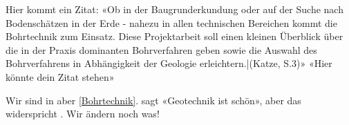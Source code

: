 Hier kommt ein Zitat: «Ob in der Baugrunderkundung oder auf der Suche nach Bodenschätzen in der Erde - nahezu in allen technischen Bereichen kommt die Bohrtechnik zum Einsatz. Diese Projektarbeit soll einen kleinen Überblick über die in der Praxis dominanten Bohrverfahren geben sowie die Auswahl des Bohrverfahrens in Abhängigkeit der Geologie erleichtern.|(Katze, S.3)» «Hier könnte dein Zitat stehen» 

Wir sind in  aber \cref{Bohrtechnik}. \textcite{ziegler2012geotechnische} sagt «Geotechnik ist schön», aber das widerspricht \cite{ziegler2012geotechnische}.
Wir ändern noch was!